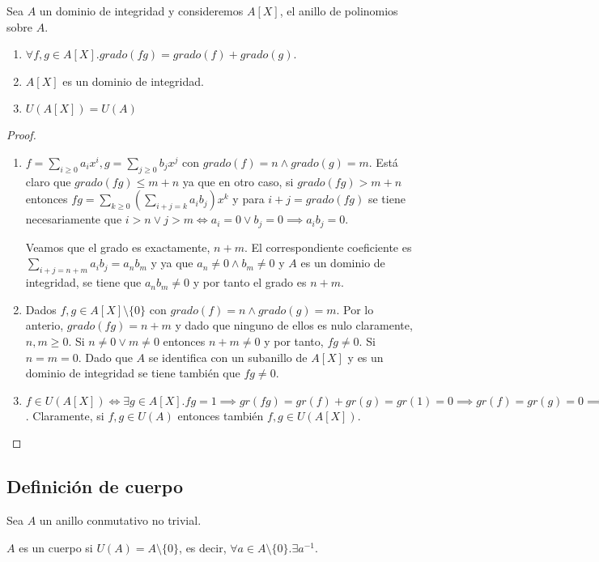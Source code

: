 \begin{proposition}
Sea $A$ un dominio de integridad y consideremos $A[X]$, el anillo de polinomios sobre $A$. 
	
\begin{enumerate}
\item $\forall f,g \in A[X]. grado(fg) = grado(f) + grado(g)$.
\item $A[X]$ es un dominio de integridad.
\item $U(A[X]) = U(A)$
\end{enumerate}
\end{proposition}
\begin{proof}
\begin{enumerate}
\item $f = \sum_{i \ge 0} a_ix^i,g = \sum_{j \ge 0} b_jx^j$ con $grado(f) = n \land grado(g) = m$. Está claro que $grado(fg) \le m + n$ ya que en otro caso, si $grado(fg) > m + n$ entonces $fg = \sum_{k \ge 0} (\sum_{i+j = k} a_ib_j) x^k$ y para $i+j = grado(fg)$ se tiene necesariamente que $i > n \lor j > m \iff a_i = 0 \lor b_j = 0 \implies a_ib_j = 0$.
	
Veamos que el grado es exactamente, $n+m$. El correspondiente coeficiente es $\sum_{i+j = n+m} a_ib_j = a_nb_m$ y ya que $a_n \neq 0 \land b_m \neq 0$ y $A$ es un dominio de integridad, se tiene que $a_nb_m \neq 0$ y por tanto el grado es $n+m$. 

\item Dados $f,g \in A[X] \setminus \{0\}$ con $grado(f) = n \land grado(g) = m$. Por lo anterio, $grado(fg) = n+m$ y dado que ninguno de ellos es nulo claramente, $n,m \ge 0$. Si $n \neq 0 \lor m \neq 0$ entonces $n+m \neq 0$ y por tanto, $fg \neq 0$. Si $n = m = 0$. Dado que $A$ se identifica con un subanillo de $A[X]$ y es un dominio de integridad se tiene también que $fg \neq 0$.

\item $f \in U(A[X]) \iff \exists g \in A[X].fg = 1 \implies gr(fg) = gr(f) + gr(g) = gr(1) = 0 \implies gr(f) = gr(g) = 0 \implies f,g \in U(A)$. Claramente, si $f,g \in U(A)$ entonces también $f,g \in U(A[X])$.
\end{enumerate}
\end{proof}


\subsection{Definición de cuerpo}

\begin{definition}[Cuerpo]
Sea $A$ un anillo conmutativo no trivial. 

$A$ es un cuerpo si $U(A) = A \setminus \{0\}$, es decir, $\forall a \in A \setminus \{0\}.\exists a^{-1}$.
\end{definition}

